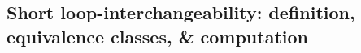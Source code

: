 \documentclass[fleqn,11pt]{article}
\newcommand\calP{\mathcal{P}}     %
\newcommand\calX{\mathcal{X}}     %
\newcommand\RelCyc{\mathcal{C_R}} %
\newcommand\symdiff{\mathop{\triangle}}
\begin{document}






\subsection{Short loop-interchangeability: definition, equivalence classes, \& computation}

\label{sub:TICE_def}
\end{document}
